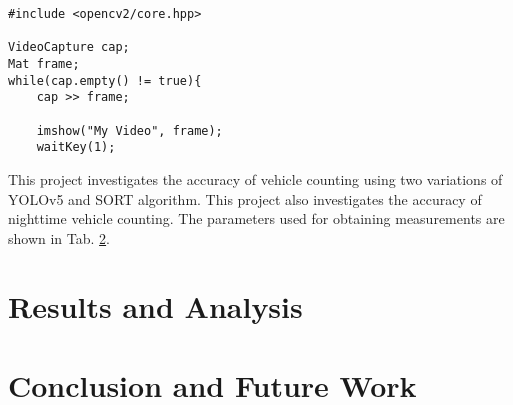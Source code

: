 \documentclass[12pt,a4paper,fleqn]{report}
\begin{document}
\begin{verbatim}
#include <opencv2/core.hpp>

VideoCapture cap;
Mat frame;
while(cap.empty() != true){ 
    cap >> frame; 
    
    imshow("My Video", frame);
    waitKey(1);
\end{verbatim}

This project investigates the accuracy of vehicle counting using two variations of YOLOv5 and SORT
algorithm. 
This project also investigates the accuracy of nighttime vehicle counting. 
The parameters used for obtaining measurements are shown in Tab. \ref{}.

\chapter{Results and Analysis}

\chapter{Conclusion and Future Work}



{}
\end{document}
